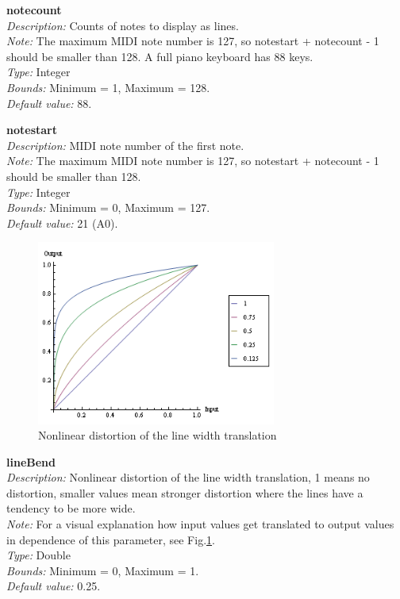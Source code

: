 \documentclass[12pt,a4paper,titlepage,oneside]{report}
\begin{document}
\noindent
\textbf{notecount} \\
\emph{Description:} Counts of notes to display as lines. \\
\emph{Note:} The maximum MIDI note number is 127, so notestart + notecount - 1 should be smaller than 128. A full piano keyboard has 88 keys. \\
\emph{Type:} Integer \\
\emph{Bounds:} Minimum = 1, Maximum = 128. \\
\emph{Default value:} 88.

\noindent
\textbf{notestart} \\
\emph{Description:} MIDI note number of the first note. \\
\emph{Note:} The maximum MIDI note number is 127, so notestart + notecount - 1 should be smaller than 128. \\
\emph{Type:} Integer \\
\emph{Bounds:} Minimum = 0, Maximum = 127. \\
\emph{Default value:} 21 (A0).

\begin{figure}[!ht]
\includegraphics[width=0.7\textwidth]{images/linebend.png}
\centering
\caption{Nonlinear distortion of the line width translation}
\label{fig:linebend}
\end{figure}

\noindent
\textbf{lineBend} \\
\emph{Description:} Nonlinear distortion of the line width translation, 1 means no distortion, smaller values mean stronger distortion where the lines have a tendency to be more wide. \\
\emph{Note:} For a visual explanation how input values get translated to output values in dependence of this parameter, see Fig.\ref{fig:linebend}. \\
\emph{Type:} Double \\
\emph{Bounds:} Minimum = 0, Maximum = 1. \\
\emph{Default value:} 0.25.
\end{document}
